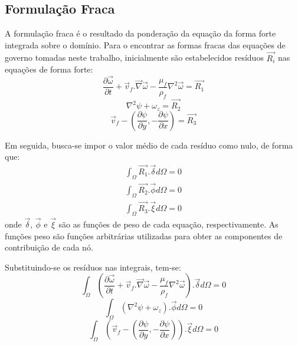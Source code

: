 \subsection{\textbf{Formulação Fraca}}
A formulação fraca é o resultado da ponderação da equação da forma forte integrada sobre o domínio.
Para o encontrar as formas fracas das equações de governo tomadas neste trabalho, inicialmente são estabelecidos resíduos $\vec{R_i}$ nas equações de forma forte:
\begin{equation}
    \dfrac{\partial \vec{\omega}}{\partial t} +
    \vec{v}_f.\vec{\nabla}\vec{\omega} -
    \dfrac{\mu_f}{\rho_f} \nabla^2 \vec{\omega} =
    \vec{R_1}
\end{equation}
\begin{equation}
    \nabla^2\psi +
    \omega_z =
    \vec{R_2}
\end{equation}
\begin{equation}
    \vec{v}_f - \left(\dfrac{\partial \psi}{\partial y},
    -\dfrac{\partial \psi}{\partial x} \right) =
    \vec{R_3}
\end{equation}

Em seguida, busca-se impor o valor médio de cada resíduo como nulo, de forma que:
\begin{align}
    \int_{\Omega} \vec{R_1} . \vec{\delta} d\Omega = 0 \\
    \int_{\Omega} \vec{R_2} . \vec{\phi} d\Omega = 0\\
    \int_{\Omega} \vec{R_3} . \vec{\xi} d\Omega = 0
\end{align}
onde $\vec{\delta}$, $\vec{\phi}$ e $\vec{\xi}$ são as funções de peso de cada equação, respectivamente.
As funções peso são funções arbitrárias utilizadas para obter as componentes de contribuição de cada nó.

Substituindo-se os resíduos nas integrais, tem-se:
\begin{equation}
    \int_{\Omega} \left(
    \dfrac{\partial \vec{\omega}}{\partial t} +
    \vec{v}_f.\vec{\nabla}\vec{\omega} -
    \dfrac{\mu_f}{\rho_f} \nabla^2 \vec{\omega}
    \right).\vec{\delta} d\Omega = 0
\end{equation}
\begin{equation}
    \int_{\Omega} \left(
    \nabla^2\psi +
    \omega_z
    \right).\vec{\phi} d\Omega = 0
\end{equation}
\begin{equation}
    \int_{\Omega} \left(
    \vec{v}_f - \left(\dfrac{\partial \psi}{\partial y},
    -\dfrac{\partial \psi}{\partial x} \right)
    \right).\vec{\xi} d\Omega = 0
\end{equation}


